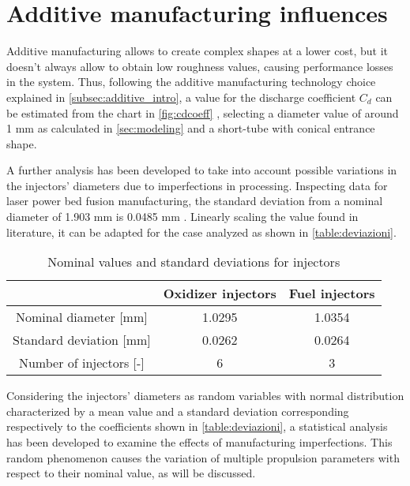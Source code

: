 \section{Additive manufacturing influences}
\label{sec:additive}

\label{cdcoeff}


Additive manufacturing allows to create complex shapes at a lower cost, but it doesn't always allow to obtain low roughness values, causing performance losses in the system. Thus, following the additive manufacturing technology choice explained in \autoref{subsec:additive_intro}, a value for the discharge coefficient $C_d$ can be estimated from the chart in \autoref{fig:cdcoeff} \cite{valori_cd}, selecting a diameter value of around 1 mm as calculated in \autoref{sec:modeling} and a short-tube with conical entrance shape. 

A further analysis has been developed to take into account possible variations in the injectors' diameters due to imperfections in processing. Inspecting data for laser power bed fusion manufacturing, the standard deviation from a nominal diameter of 1.903 mm is 0.0485 mm \cite{lpbf_accuracy}. Linearly scaling the value found in literature, it can be adapted for the case analyzed as shown in \autoref{table:deviazioni}.


\vspace*{7mm}
\begin{table}[H]
    \renewcommand{\arraystretch}{1.5}
    \centering
    \begin{tabular}{|c|c|c|}
        \hline
         & \textbf{Oxidizer injectors} & \textbf{Fuel injectors}\\
        \hline
        \hline
        Nominal diameter [mm] & 1.0295 & 1.0354 \\ 
        \hline
        Standard deviation [mm] & 0.0262 & 0.0264 \\
        \hline
        Number of injectors [-] & 6 & 3 \\
        \hline
    \end{tabular}
    \caption{Nominal values and standard deviations for injectors}
    \label{table:deviazioni}
\end{table}

Considering the injectors' diameters as random variables with normal distribution characterized by a mean value and a standard deviation corresponding respectively to the coefficients shown in \autoref{table:deviazioni}, a statistical analysis has been developed to examine the effects of manufacturing imperfections. This random phenomenon causes the variation of multiple propulsion parameters with respect to their nominal value, as will be discussed.

